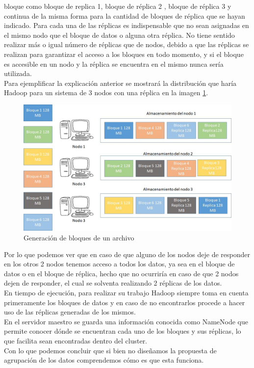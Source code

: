 bloque como bloque de replica 1, bloque de réplica 2 , bloque de réplica 3 y continua de la
misma forma para la cantidad de bloques de réplica que se hayan indicado. Para cada una
de las réplicas es indispensable que no sean asignadas en el mismo nodo que el bloque de
datos o alguna otra réplica. No tiene sentido realizar más o igual número de réplicas que de
nodos, debido a que las réplicas se realizan para garantizar el acceso a los bloques en todo
momento, y si el bloque es accesible en un nodo y la réplica se encuentra en el mismo
nunca sería utilizada.
\\
Para ejemplificar la explicación anterior se mostrará la distribución que haría Hadoop para un sistema de 3 nodos con una réplica en
la imagen \ref{fig:red3}.
\newpage
\begin{figure}[!htbp]
	\hypertarget{fig:red3}{\hspace{1pt}}
	\begin{center}
		\includegraphics[width=.7\textwidth]{capitulo3/images/im3.png}
		\caption{Generación de bloques de un archivo}
		\label{fig:red3}
	\end{center}
\end{figure}
Por lo que podemos ver que en caso de que alguno de los nodos deje de responder en los
otros 2 nodos tenemos acceso a todos los datos, ya sea en el bloque de datos o en el
bloque de réplica, hecho que no ocurriría en caso de que 2 nodos dejen de responder, el
cual se solventa realizando 2 réplicas de los datos.
\\
En tiempo de ejecución, para realizar su trabajo Hadoop siempre toma en cuenta primeramente los bloques de datos
y en caso de no encontrarlos procede a hacer uso de las réplicas generadas de los mismos.
\\
En el servidor maestro se guarda una información conocida como NameNode que permite
conocer dónde se encuentran cada uno de los bloques y sus réplicas, lo que facilita sean encontradas dentro del cluster.
\\
Con lo que podemos concluir que si bien no diseñamos la propuesta de agrupación de los datos comprendemos cómo es que esta funciona.
